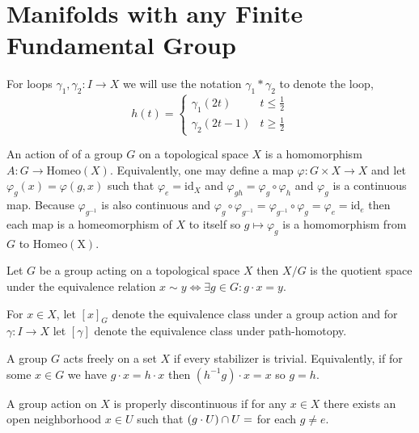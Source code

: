 \documentclass[12pt]{extarticle}
\begin{document}
\section{Manifolds with any Finite Fundamental Group}

\begin{remark}
For loops $\gamma_1, \gamma_2 : I \to X$ we will use the notation $\gamma_1 * \gamma_2$ to denote the loop, \[h(t) = \begin{cases} \gamma_1(2t) & t \le \frac{1}{2} \\ \gamma_2(2t - 1) & t \ge \frac{1}{2} \end{cases}\]
\end{remark}

\begin{definition}
An action of of a group $G$ on a topological space $X$ is a homomorphism $A : G \to \mathrm{Homeo}(X)$. Equivalently, one may define a map $\varphi : G \times X \to X$ and let $\varphi_g(x) = \varphi(g, x)$ such that $\varphi_e = \mathrm{id}_X$ and $\varphi_{gh} = \varphi_g \circ \varphi_h$ and $\varphi_g$ is a continuous map. Because $\varphi_{g^{-1}}$ is also continuous and $\varphi_g \circ \varphi_{g^{-1}} = \varphi_{g^{-1}} \circ \varphi_{g} = \varphi_e = \mathrm{id}_e$ then each map is a homeomorphism of $X$ to itself so $g \mapsto \varphi_g$ is a homomorphism from $G$ to $\mathrm{Homeo(X)}$.  
\end{definition}

\begin{definition}
Let $G$ be a group acting on a topological space $X$ then $X/G$ is the quotient space under the equivalence relation $x \sim y \iff \exists g \in G : g \cdot x = y$. 
\end{definition}

\begin{remark}
For $x \in X$, let $[x]_G$ denote the equivalence class under a group action and for $\gamma : I \to X$ let $[\gamma]$ denote the equivalence class under path-homotopy. 
\end{remark}

\begin{definition}
A group $G$ acts freely on a set $X$ if every stabilizer is trivial. Equivalently, if for some $x \in G$ we have $g \cdot x = h \cdot x$ then $(h^{-1}g) \cdot x = x$ so $g = h$. 
\end{definition}

\begin{definition}
A group action on $X$ is properly discontinuous if for any $x \in X$ there exists an open neighborhood $x \in U$ such that $(g \cdot U) \cap U = \empty$ for each $g \neq e$. 
\end{definition}
\end{document}
